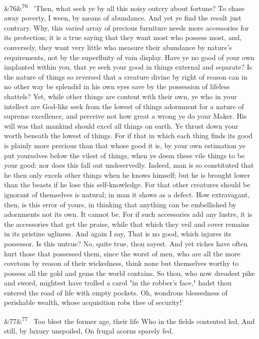 \documentclass[12pt]{article}
\newcommand{\para}[1][]{\par\noindent\ifx&#1&\else\textsuperscript{\footnotesize #1}~\fi}
\begin{document}
\para[76] 'Then, what seek ye by all this noisy outcry about fortune? To chase away poverty, I ween, by means of abundance. And yet ye find the result just contrary. Why, this varied array of precious furniture needs more accessories for its protection; it is a true saying that they want most who possess most, and, conversely, they want very little who measure their abundance by nature's requirements, not by the superfluity of vain display. Have ye no good of your own implanted within you, that ye seek your good in things external and separate? Is the nature of things so reversed that a creature divine by right of reason can in no other way be splendid in his own eyes save by the possession of lifeless chattels? Yet, while other things are content with their own, ye who in your intellect are God-like seek from the lowest of things adornment for a nature of supreme excellence, and perceive not how great a wrong ye do your Maker. His will was that mankind should excel all things on earth. Ye thrust down your worth beneath the lowest of things. For if that in which each thing finds its good is plainly more precious than that whose good it is, by your own estimation ye put yourselves below the vilest of things, when ye deem these vile things to be your good: nor does this fall out undeservedly. Indeed, man is so constituted that he then only excels other things when he knows himself; but he is brought lower than the beasts if he lose this self-knowledge. For that other creatures should be ignorant of themselves is natural; in man it shows as a defect. How extravagant, then, is this error of yours, in thinking that anything can be embellished by adornments not its own. It cannot be. For if such accessories add any lustre, it is the accessories that get the praise, while that which they veil and cover remains in its pristine ugliness. And again I say, That is no good, which injures its possessor. Is this untrue? No, quite true, thou sayest. And yet riches have often hurt those that possessed them, since the worst of men, who are all the more covetous by reason of their wickedness, think none but themselves worthy to possess all the gold and gems the world contains. So thou, who now dreadest pike and sword, mightest have trolled a carol "in the robber's face," hadst thou entered the road of life with empty pockets. Oh, wondrous blessedness of perishable wealth, whose acquisition robs thee of security!'

\para[77] Too blest the former age, their life Who in the fields contented led, And still, by luxury unspoiled, On frugal acorns sparely fed.
\end{document}
